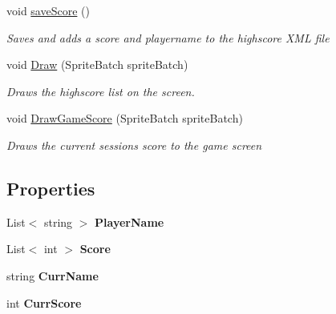 \begin{DoxyCompactItemize}
void \hyperlink{class_pacman_1_1_high_score_ab31998069c068d94db02af5828c67485}{save\-Score} ()
\begin{DoxyCompactList}\small\item\em Saves and adds a score and playername to the highscore X\-M\-L file \end{DoxyCompactList}\item 
void \hyperlink{class_pacman_1_1_high_score_a10c6f491c388a5d9f9f66586903212a1}{Draw} (Sprite\-Batch sprite\-Batch)
\begin{DoxyCompactList}\small\item\em Draws the highscore list on the screen. \end{DoxyCompactList}\item 
void \hyperlink{class_pacman_1_1_high_score_a3aa42396b5a3a86f25e0accb55d6f462}{Draw\-Game\-Score} (Sprite\-Batch sprite\-Batch)
\begin{DoxyCompactList}\small\item\em Draws the current sessions score to the game screen \end{DoxyCompactList}\end{DoxyCompactItemize}
\subsection*{Properties}
\begin{DoxyCompactItemize}
\item 
\hypertarget{class_pacman_1_1_high_score_a736e02a65f0e70e1acb09974ddc153c7}{List$<$ string $>$ {\bfseries Player\-Name}}\label{class_pacman_1_1_high_score_a736e02a65f0e70e1acb09974ddc153c7}

\item 
\hypertarget{class_pacman_1_1_high_score_a8c4c44992f91dc85d0eeeb2e21cc8aff}{List$<$ int $>$ {\bfseries Score}}\label{class_pacman_1_1_high_score_a8c4c44992f91dc85d0eeeb2e21cc8aff}

\item 
\hypertarget{class_pacman_1_1_high_score_af3465470096fe8a05609c64a4676392e}{string {\bfseries Curr\-Name}}\label{class_pacman_1_1_high_score_af3465470096fe8a05609c64a4676392e}

\item 
\hypertarget{class_pacman_1_1_high_score_abcbe644064af64df05ea2c394311ed5c}{int {\bfseries Curr\-Score}}\label{class_pacman_1_1_high_score_abcbe644064af64df05ea2c394311ed5c}

\end{DoxyCompactItemize}


